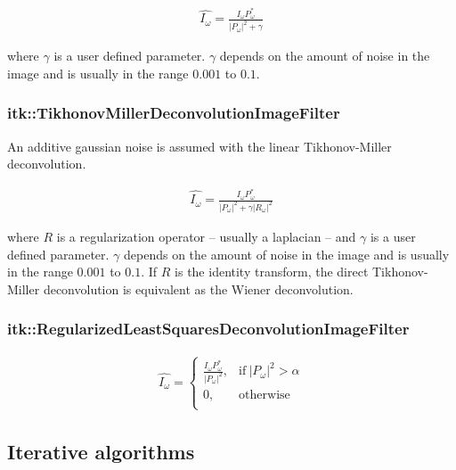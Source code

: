 \documentclass{InsightArticle}
\begin{document}
\begin{eqnarray}
\label{eq:imageFormation}
\hat{I_{\omega}} = \frac{I_{\omega} P_{\omega}^*}{\lvert P_{\omega}\rvert^2 + \gamma}
\end{eqnarray}

where $\gamma$ is a user defined parameter. $\gamma$ depends on the amount of noise in the image and is
usually in the range $0.001$ to $0.1$.

\subsubsection{itk::TikhonovMillerDeconvolutionImageFilter}

An additive gaussian noise is assumed with the linear Tikhonov-Miller deconvolution. 

\begin{eqnarray}
\label{eq:imageFormation}
\hat{I_{\omega}} = \frac{I_{\omega} P_{\omega}^*}{\lvert P_{\omega}\rvert^2 + \gamma\lvert R_{\omega}\rvert^2}
\end{eqnarray}

where $R$ is a regularization operator -- usually a laplacian -- and $\gamma$ is a user defined parameter.
$\gamma$ depends on the amount of noise in the image and is usually in the range $0.001$ to $0.1$.
If $R$ is the identity transform, the direct Tikhonov-Miller deconvolution is equivalent as the Wiener deconvolution.

\subsubsection{itk::RegularizedLeastSquaresDeconvolutionImageFilter}

\begin{eqnarray}
\label{eq:imageFormation}
\hat{I_{\omega}} =
\begin{cases} 
  \frac{I_{\omega} P_{\omega}^*}{\lvert P_{\omega}\rvert^2},  & \text{if}~ \lvert P_{\omega}\rvert^2 > \alpha \\
  0,  & \text{otherwise} \\
\end{cases}
\end{eqnarray}


\subsection{Iterative algorithms}
\end{document}
